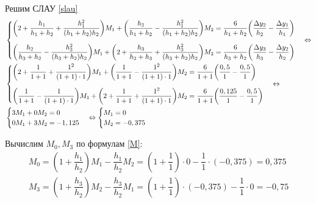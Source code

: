 \documentclass[a4paper, 12pt]{article}
\begin{document}
	Решим СЛАУ \eqref{slau}
	\begin{equation*}
		\begin{aligned}
			&\begin{cases}
				\bigg(2+\dfrac{h_1}{h_1+h_2}+\dfrac{h_1^2}{(h_1+h_2)h_2}\bigg)M_1 + \bigg(\dfrac{h_2}{h_1+h_2}-\dfrac{h_1^2}{(h_1+h_2)h_2}\bigg)M_2 = 
				\dfrac{6}{h_1+h_2}\bigg(\dfrac{\Delta y_2}{h_2}-\dfrac{\Delta y_1}{h_1}\bigg) \vspace{1em} \\ 
				\bigg(\dfrac{h_{2}}{h_{3}+h_{2}}-\dfrac{h_3^2}{(h_3+h_{2})h_{2}}\bigg)M_{1} + \bigg(2+\dfrac{h_3}{h_{2}+h_3}+\dfrac{h_3^2}{(h_3+h_{2})h_{2}}\bigg)M_{2} = 
				\dfrac{6}{h_3+h_{2}}\bigg(\dfrac{\Delta y_3}{h_3}-\dfrac{\Delta y_{2}}{h_{2}}\bigg)\\
			\end{cases}\Leftrightarrow\\
			&\begin{cases}
				\bigg(2+\dfrac{1}{1+1}+\dfrac{1^2}{(1+1)\cdot 1}\bigg)M_1 + \bigg(\dfrac{1}{1+1}-\dfrac{1^2}{(1+1)\cdot 1}\bigg)M_2 = 
				\dfrac{6}{1+1}\bigg(\dfrac{0,5}{1}-\dfrac{0,5}{1}\bigg) \vspace{1em} \\ 				\bigg(\dfrac{1}{1+1}-\dfrac{1}{(1+1)\cdot 1}\bigg)M_{1} + \bigg(2+\dfrac{1}{1+1}+\dfrac{1^2}{(1+1)\cdot 1}\bigg)M_{2} =
				\dfrac{6}{1+1}\bigg(\dfrac{0,125}{1}-\dfrac{0,5}{1}\bigg)
			\end{cases}\Leftrightarrow\\
			&\begin{cases}
				3M_1 + 0M_2 = 
				0 \vspace{0em} \\ 				
				0M_{1} + 3M_{2} =
				-1,125
			\end{cases}\Leftrightarrow
			\begin{cases}
				M_1=0\\
				M_2=-0,375
			\end{cases}
		\end{aligned}
	\end{equation*}
	
	Вычислим $M_0,M_3$ по формулам \eqref{M}:
	\begin{equation*}
		\begin{gathered}
			M_0=(1+\dfrac{h_1}{h_2})M_1-\dfrac{h_1}{h_2}M_2=(1+\dfrac{1}{1})\cdot 0-\dfrac{1}{1}\cdot(-0,375)=0,375\\
			M_3=(1+\dfrac{h_3}{h_{2}})M_{2}-\dfrac{h_3}{h_{2}}M_{1}=(1+\dfrac{1}{1})\cdot(-0,375)-\dfrac{1}{1}\cdot0=-0,75
		\end{gathered}		
	\end{equation*}
	
\end{document}
